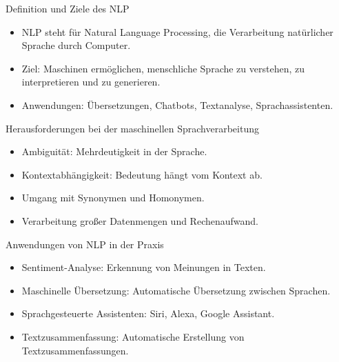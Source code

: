 \documentclass[aspectratio=1610, xcolor=dvipsnames, 9pt]{beamer}
\begin{document}
\begin{frame}{Definition und Ziele des NLP}
  \begin{itemize}
    \item NLP steht für Natural Language Processing, die Verarbeitung natürlicher Sprache durch Computer. \\
    \item Ziel: Maschinen ermöglichen, menschliche Sprache zu verstehen, zu interpretieren und zu generieren. \\
    \item Anwendungen: Übersetzungen, Chatbots, Textanalyse, Sprachassistenten.
  \end{itemize}
\end{frame}

\begin{frame}{Herausforderungen bei der maschinellen Sprachverarbeitung}
  \begin{itemize}
    \item Ambiguität: Mehrdeutigkeit in der Sprache.\\
    \item Kontextabhängigkeit: Bedeutung hängt vom Kontext ab.\\
    \item Umgang mit Synonymen und Homonymen. \\
    \item Verarbeitung großer Datenmengen und Rechenaufwand.
  \end{itemize}
\end{frame}

\begin{frame}{Anwendungen von NLP in der Praxis}
  \begin{itemize}
    \item Sentiment-Analyse: Erkennung von Meinungen in Texten. \\
    \item Maschinelle Übersetzung: Automatische Übersetzung zwischen Sprachen. \\
    \item Sprachgesteuerte Assistenten: Siri, Alexa, Google Assistant. \\
    \item Textzusammenfassung: Automatische Erstellung von Textzusammenfassungen.
  \end{itemize}
\end{frame}
\end{document}
